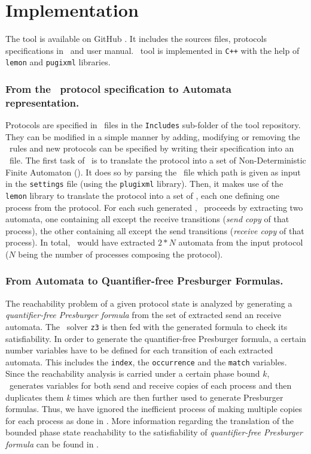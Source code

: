 \section{Implementation}
\label{sec:optim}

The tool is available on GitHub \cite{github.MPass}.
It includes the sources files, protocols specifications in \xml\ and user manual.
%
\MPass\ tool is implemented in \texttt{C++} with the help of \texttt{lemon} and \texttt{pugixml} libraries.
%

\subsubsection*{From the \Xml\ protocol specification to Automata representation.}
\label{subsec:copies}
Protocols are specified in \Xml\ files in the \texttt{Includes} sub-folder of the tool repository.
%
They can be modified in a simple manner by adding, modifying or removing the \Xml\ rules and
new protocols can be specified by writing their specification into an \Xml\ file.
%
The first task of \MPass\ is to translate the protocol into a set of Non-Deterministic Finite Automaton (\Nfa).
%
It does so by parsing the \Xml\ file which path is given as input in the \texttt{settings} file (using the \texttt{plugixml} library).
%
Then, it makes use of the \texttt{lemon} library to translate the protocol into a set of \Nfa,
each one defining one process from the protocol.
%
For each such generated \Nfa, \MPass\ proceeds by extracting two automata,
one containing all except the receive transitions (\textit{send copy} of that process),
the other containing all except the send transitions (\textit{receive copy} of that process).
%
In total, \MPass\ would have extracted $2*N$ automata from the input protocol
($N$ being the number of processes composing the protocol).

\subsubsection*{From Automata to Quantifier-free Presburger Formulas.}
The reachability problem of a given protocol state is analyzed by generating a \emph{quantifier-free Presburger formula}
from the set of extracted send an receive automata.
The \Smt\ solver \texttt{z3} is then fed with the generated formula to check its satisfiability.
%
In order to generate the quantifier-free Presburger formula, a certain number variables have to be 
defined for each transition of each extracted automata.
This includes the \texttt{index}, the \texttt{occurrence} and the \texttt{match} variables.
%
Since the reachability analysis is carried under a certain phase bound $k$,
\MPass\ generates variables for both send and receive copies of each process and then duplicates them \emph{k} times
which are then further used to generate Presburger formulas.
Thus, we have ignored the inefficient process of making multiple copies for each process as done in \cite{AAC13}.
%
More information regarding the translation of the bounded phase state reachability to the satisfiability of \emph{quantifier-free Presburger formula} can be found in \cite{AAC13}.

